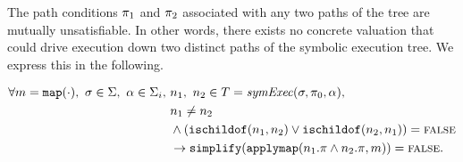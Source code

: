 \begin{property}
  \label{prop:kingunique}
The path conditions $\pi_1$ and $\pi_2$ associated with any two paths of the
tree are mutually unsatisfiable. In other words, there exists no concrete
valuation that could drive execution down two distinct paths of the symbolic
execution tree. We express this in the following.

\begin{align*}
\forall m = \mathtt{map(\cdot)},~\sigma \in \Sigma,~\alpha \in
\Sigma_i,~& n_1,~ n_2 \in T =
\mathit{symExec}(\sigma,\pi_0,\alpha), \\
& n_1 \neq n_2 \\
&  \wedge
(\mathtt{ischildof}(n_1, n_2) \vee  \mathtt{ischildof}(n_2, n_1))= \mathtt{\textsc{false}} \\
&\rightarrow \mathtt{simplify}(\mathtt{applymap}(n_1.\pi \wedge n_2.\pi,m)) = \mathtt{\textsc{false}}.
\end{align*}

\end{property}

